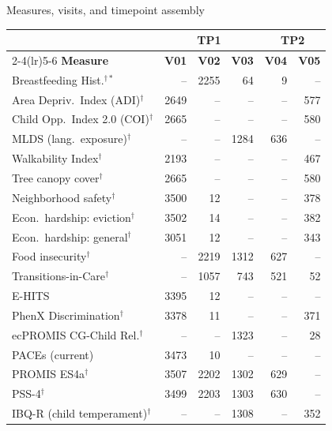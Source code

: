 \documentclass[final]{beamer}
\newlength{\colwidth}
\begin{document}
\begin{frame}[t]
\begin{columns}[t]
\begin{column}{\colwidth}
  \vspace{-0.6cm}
  \begin{block}{Measures, visits, and timepoint assembly}
    \vspace{-0.1cm}
    \fontsize{9.5}{9.5}\selectfont
    \begin{tabularx}{\linewidth}{X r r r r r}
            \toprule
            & \multicolumn{3}{c}{TP1} & \multicolumn{2}{c}{TP2} \\
            \cmidrule(lr){2-4}\cmidrule(lr){5-6}
            \textbf{Measure} & \textbf{V01} & \textbf{V02} & \textbf{V03} & \textbf{V04} & \textbf{V05} \\
            \midrule
            Breastfeeding Hist.$^{\dagger *}$ & -- & 2255 & 64 & 9 & -- \\
            Area Depriv.\ Index (ADI)$^\dagger$ & 2649 & -- & -- & -- & 577 \\
            Child Opp.\ Index 2.0 (COI)$^\dagger$ & 2665 & -- & -- & -- & 580 \\
            MLDS (lang.\ exposure)$^\dagger$ & -- & -- & 1284 & 636 & -- \\
            Walkability Index$^\dagger$ & 2193 & -- & -- & -- & 467 \\
            Tree canopy cover$^\dagger$ & 2665 & -- & -- & -- & 580 \\
            Neighborhood safety$^\dagger$ & 3500 & 12 & -- & -- & 378 \\
            Econ.\ hardship: eviction$^\dagger$ & 3502 & 14 & -- & -- & 382 \\
            Econ.\ hardship: general$^\dagger$ & 3051 & 12 & -- & -- & 343 \\
            Food insecurity$^\dagger$ & -- & 2219 & 1312 & 627 & -- \\
            Transitions-in-Care$^\dagger$ & -- & 1057 & 743 & 521 & 52 \\
            E-HITS & 3395 & 12 & -- & -- & -- \\
            PhenX Discrimination$^\dagger$ & 3378 & 11 & -- & -- & 371 \\
            ecPROMIS CG-Child Rel.$^\dagger$ & -- & -- & 1323 & -- & 28 \\
            PACEs (current) & 3473 & 10 & -- & -- & -- \\
            PROMIS ES4a$^\dagger$ & 3507 & 2202 & 1302 & 629 & -- \\
            PSS-4$^\dagger$ & 3499 & 2203 & 1303 & 630 & -- \\
            IBQ-R (child temperament)$^\dagger$ & -- & -- & 1308 & -- & 352 \\

\end{tabularx}
\end{block}
\end{column}
\end{columns}
\end{frame}
\end{document}
